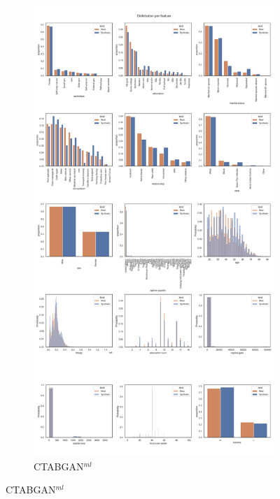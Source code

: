 \begin{landscape}
	\begin{figure}[h]
		\centering
		\hfill
		\begin{subfigure}{0.45\linewidth}
			\includegraphics[height=\textheight,width=\linewidth,keepaspectratio]{images/distributions_full/ctabgan.jpg}
			\caption{CTABGAN$^{ml}$}
		\end{subfigure}

\end{figure}
\end{landscape}
